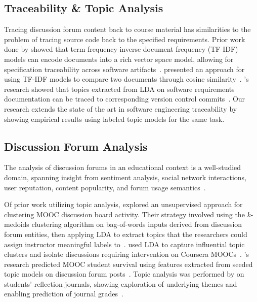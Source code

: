 \documentclass[sigconf, nonacm=true]{acmart}
\begin{document}
\subsection{Traceability \& Topic Analysis}
Tracing discussion forum content back to course material has similarities to the problem of tracing source code back to the specified requirements.
Prior work done by \citeauthor{4556122} showed that term frequency-inverse document frequency (TF-IDF) models can encode documents into a rich vector space model, allowing for specification traceability across software artifacts~\cite{4556122}.
\citeauthor{Tata:2007:EST:1328854.1328855} presented an approach for using TF-IDF models to compare two documents through cosine similarity~\cite{Tata:2007:EST:1328854.1328855}.
\citeauthor{hindle2012relating}'s research showed that topics extracted from LDA on software requirements documentation can be traced to corresponding version control commits~\cite{hindle2012relating}.
Our research extends the state of the art in software engineering traceability by showing empirical results using labeled topic models for the same task.


\subsection{Discussion Forum Analysis}
The analysis of discussion forums in an educational context is a well-studied domain, spanning insight from sentiment analysis, social network interactions, user reputation, content popularity, and forum usage semantics~\cite{wen2014sentiment,wong2015analysis,coetzee2014should,breslow2013studying,onah2014exploring}.

Of prior work utilizing topic analysis, \citeauthor{ezen2015unsupervised} explored an unsupervised approach for clustering MOOC discussion board activity. Their strategy involved using the $k$-medoids clustering algorithm on bag-of-words inputs derived from discussion forum entities, then applying LDA to extract topics that the researchers could assign instructor meaningful labels to~\cite{ezen2015unsupervised}.
\citeauthor{atapattu2016topic} used LDA to capture influential topic clusters and isolate discussions requiring intervention on Coursera MOOCs~\cite{atapattu2016topic}.
\citeauthor{ramesh2014understanding}'s research predicted MOOC student survival using features extracted from seeded topic models on discussion forum posts~\cite{ramesh2014understanding}.
Topic analysis was performed by \citeauthor{Chen:2016:TME:2883851.2883951} on students' reflection journals, showing exploration of underlying themes and enabling prediction of journal grades~\cite{Chen:2016:TME:2883851.2883951}.
\end{document}
